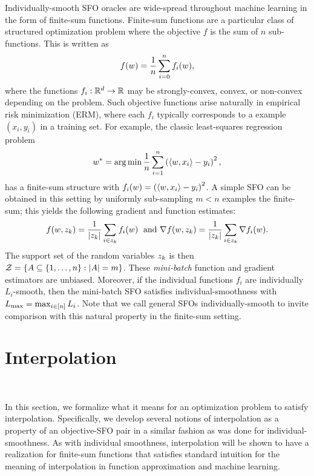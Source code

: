 Individually-smooth SFO oracles are wide-spread throughout machine learning in the form of finite-sum functions. 
Finite-sum functions are a particular class of structured optimization problem where the objective \( f \) is the sum of \( n \) sub-functions. 
This is written as
\begin{align*}
    f(w) = \frac{1}{n} \sum_{i = 0}^n f_i(w), 
\end{align*}
where the functions \( f_i : \mathbb{R}^d \rightarrow \mathbb{R} \) may be strongly-convex, convex, or non-convex depending on the problem.
Such objective functions arise naturally in empirical risk minimization (ERM), where each \( f_i \) typically corresponds to a example \( (x_i, y_i) \) in a training set.
For example, the classic least-squares regression problem 
\[ w^* = \mathop{\rm arg\,min} \frac{1}{n} \sum_{i=1}^n \left(\left\langle w, x_i\right\rangle - y_i\right)^2, \]
has a finite-sum structure with \( f_i(w) =  \left(\left\langle w, x_i\right\rangle - y_i\right)^2\).
A simple SFO can be obtained in this setting by uniformly sub-sampling \( m < n \) examples the finite-sum; this yields the following gradient and function estimates:
\[ f(w, z_{k}) = \frac{1}{|z_{k}|} \sum_{i \in z_{k}} f_i(w) \; \text{ and } \nabla f(w, z_{k}) = \frac{1}{|z_{k}|} \sum_{i \in z_{k}} \nabla f_i(w). \]
The support set of the random variables \( z_{k} \) is then \( \mathcal{Z} = \left\{ A \subseteq \left\{1, \dots, n\right\} : |A| = m \right\} \).
These \emph{mini-batch} function and gradient estimators are unbiased.
Moreover, if the individual functions \( f_i \) are individually \( L_i \)-smooth, then the mini-batch SFO satisfies individual-smoothness with \( L_{\text{max}} = \max_{i\in [n]} L_i \).
Note that we call general SFOs \oracle{} individually-smooth to invite comparison with this natural property in the finite-sum setting. 


\section{Interpolation}~\label{sec:interpolation}

In this section, we formalize what it means for an optimization problem to satisfy interpolation.
Specifically, we develop several notions of interpolation as a property of an objective-SFO pair in a similar fashion as was done for individual-smoothness.
As with individual smoothness, interpolation will be shown to have a realization for finite-sum functions that satisfies standard intuition for the meaning of interpolation in function approximation and machine learning. 

